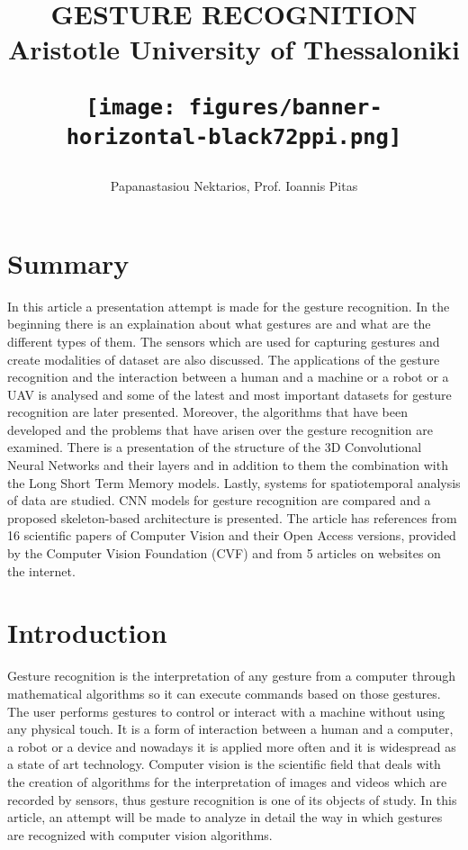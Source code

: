 \documentclass[12pt]{book}
\begin{document}
\title{
{GESTURE RECOGNITION} \\
{\large Aristotle University of Thessaloniki}\\
{\begin{figure}[!htbp]
\centering
  \texttt{[image: figures/banner-horizontal-black72ppi.png]}
  \\
  \label{fig:fig0}
\end{figure}}
}
\author{Papanastasiou Nektarios, Prof. Ioannis Pitas}
\maketitle
\date

\setcounter{page}{1}

\chapter*{Summary}
In this article a presentation attempt is made for the gesture recognition. In the beginning there is an explaination about what gestures are and what are the different types of them. The sensors which are used for capturing gestures and create modalities of dataset are also discussed. The applications of the gesture recognition and the interaction between a human and a machine or a robot or a UAV is analysed and some of the latest and most important datasets for gesture recognition are later presented. Moreover, the algorithms that have been developed and the problems that have arisen over the gesture recognition are examined. There is a presentation of the structure of the 3D Convolutional Neural Networks and their layers and in addition to them the combination with the Long Short Term Memory models. Lastly, systems for spatiotemporal analysis of data are studied. CNN models for gesture recognition are compared and a proposed skeleton-based architecture is presented. The article has references from 16 scientific papers of Computer Vision and their Open Access versions, provided by the Computer Vision Foundation (CVF) and from 5 articles on websites on the internet.

\tableofcontents

\chapter*{Introduction}\label{intro}
Gesture recognition is the interpretation of any gesture from a computer through mathematical algorithms so it can execute commands based on those gestures. The user performs gestures to control or interact with a machine without using any physical touch.  It is a form of interaction between a human and a computer, a robot or a device and nowadays it is applied more often and it is widespread as a state of art technology. Computer vision is the scientific field that deals with the creation of algorithms for the interpretation of images and videos which are recorded by sensors, thus gesture recognition is one of its objects of study. In this article, an attempt will be made to analyze in detail the way in which gestures are recognized with computer vision algorithms. 
\end{document}
